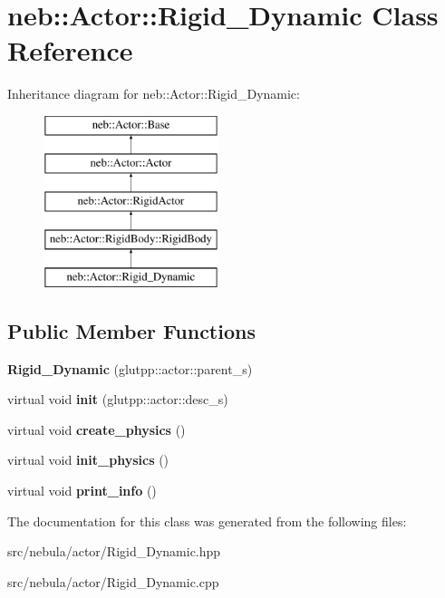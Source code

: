 \hypertarget{classneb_1_1Actor_1_1Rigid__Dynamic}{\section{neb\-:\-:\-Actor\-:\-:\-Rigid\-\_\-\-Dynamic \-Class \-Reference}
\label{classneb_1_1Actor_1_1Rigid__Dynamic}
}
\-Inheritance diagram for neb\-:\-:\-Actor\-:\-:\-Rigid\-\_\-\-Dynamic\-:\begin{figure}[H]
\begin{center}
\leavevmode
\includegraphics[height=5.000000cm]{classneb_1_1Actor_1_1Rigid__Dynamic}
\end{center}
\end{figure}
\subsection*{\-Public \-Member \-Functions}
\begin{DoxyCompactItemize}
\item 
\hypertarget{classneb_1_1Actor_1_1Rigid__Dynamic_ab532d1a36c9b942caa1e136d274308f8}{{\bfseries \-Rigid\-\_\-\-Dynamic} (glutpp\-::actor\-::parent\-\_\-s)}\label{classneb_1_1Actor_1_1Rigid__Dynamic_ab532d1a36c9b942caa1e136d274308f8}

\item 
\hypertarget{classneb_1_1Actor_1_1Rigid__Dynamic_a8ed2e28125967f980bb55d5697ea5b81}{virtual void {\bfseries init} (glutpp\-::actor\-::desc\-\_\-s)}\label{classneb_1_1Actor_1_1Rigid__Dynamic_a8ed2e28125967f980bb55d5697ea5b81}

\item 
\hypertarget{classneb_1_1Actor_1_1Rigid__Dynamic_a22912f857b64132c4638e94a3454a801}{virtual void {\bfseries create\-\_\-physics} ()}\label{classneb_1_1Actor_1_1Rigid__Dynamic_a22912f857b64132c4638e94a3454a801}

\item 
\hypertarget{classneb_1_1Actor_1_1Rigid__Dynamic_a81bda0edf17d6b7ed7f0c807cc23cc33}{virtual void {\bfseries init\-\_\-physics} ()}\label{classneb_1_1Actor_1_1Rigid__Dynamic_a81bda0edf17d6b7ed7f0c807cc23cc33}

\item 
\hypertarget{classneb_1_1Actor_1_1Rigid__Dynamic_a20ebed0437aec0f1ad5ca0bb2c2edf4a}{virtual void {\bfseries print\-\_\-info} ()}\label{classneb_1_1Actor_1_1Rigid__Dynamic_a20ebed0437aec0f1ad5ca0bb2c2edf4a}

\end{DoxyCompactItemize}


\-The documentation for this class was generated from the following files\-:\begin{DoxyCompactItemize}
\item 
src/nebula/actor/\-Rigid\-\_\-\-Dynamic.\-hpp\item 
src/nebula/actor/\-Rigid\-\_\-\-Dynamic.\-cpp\end{DoxyCompactItemize}

